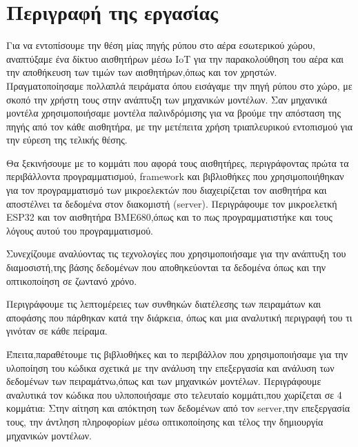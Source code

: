 \section{Περιγραφή της εργασίας}



Για να εντοπίσουμε την θέση μίας πηγής ρύπου στο αέρα εσωτερικού χώρου,
αναπτύξαμε ένα δίκτυο αισθητήρων μέσω IoT για την παρακολούθηση του αέρα και την αποθήκευση των τιμών των αισθητήρων,όπως και τον χρηστών.
Πραγματοποίησαμε πολλαπλά πειράματα όπου εισάγαμε την πηγή ρύπου στο χώρο, με σκοπό την χρήστη τους στην ανάπτυξη των μηχανικών μοντέλων. 
Σαν μηχανικά μοντέλα χρησιμοποιήσαμε μοντέλα παλινδρόμισης για να βρούμε την απόσταση της πηγής από τον κάθε αισθητήρα,
με την μετέπειτα χρήση τριαπλευρικού εντοπισμού για την εύρεση της τελικής θέσης.

Θα ξεκινήσουμε με το κομμάτι που αφορά τους αισθητήρες,
περιγράφοντας πρώτα τα περιβάλλοντα προγραμματισμού, framework και βιβλιοθήκες που χρησιμοποιήθηκαν για τον προγραμματισμό των  μικροελεκτών που διαχειρίζεται τον αισθητήρα και αποστέλνει τα δεδομένα στον διακομιστή (server).
Περιγράφουμε τον μικροελετκή ESP32 και τον αισθητήρα BME680,όπως και το πως προγραμματιστήκε και τους λόγους αυτού του προγραμματισμού.

Συνεχίζουμε αναλύοντας τις τεχνολογίες που χρησιμοποιήσαμε για την ανάπτυξη του διαμοσιστή,της βάσης δεδομένων που αποθηκεύονται τα δεδομένα όπως και την οπτικοποίηση σε ζωντανό χρόνο.

Περιγράφουμε τις λεπτομέρειες των συνθηκών διατέλεσης των πειραμάτων και αποφάσης που πάρθηκαν κατά την διάρκεια, όπως και μια αναλυτική περιγραφή του τι γινόταν σε κάθε πείραμα.

Έπειτα,παραθέτουμε τις βιβλιοθήκες και το περιβάλλον που χρησιμοποιήσαμε για την υλοποίηση του κώδικα σχετικά με την ανάλυση την επεξεργασία και ανάλυση των δεδομένων των πειραμάτνω,όπως και των μηχανικών μοντέλων.
Περιγράφουμε αναλυτικά τον κώδικα που υλποποιήσαμε στο τελευταίο κομμάτι,που χωρίζεται σε 4 κομμάτια:
Στην αίτηση και απόκτηση των δεδομένων από τον server,την επεξεργασία τους, την άντληση πληροφορίων μέσω οπτικοποίησης και τέλος την δημιουργία μηχανικών μοντέλων.
